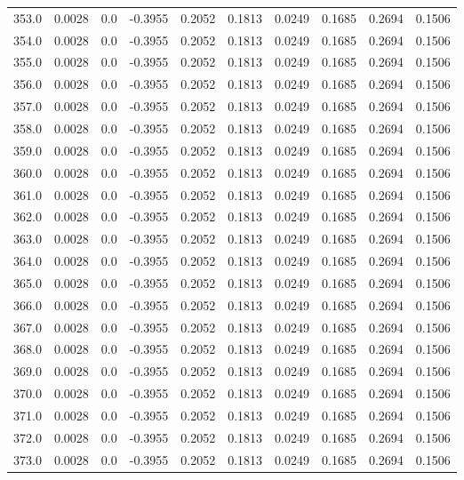 \begin{longtable}{lrrrrrrrrr}
353.0 & 0.0028 & 0.0 & -0.3955 & 0.2052 & 0.1813 & 0.0249 & 0.1685 & 0.2694 & 0.1506 \\
354.0 & 0.0028 & 0.0 & -0.3955 & 0.2052 & 0.1813 & 0.0249 & 0.1685 & 0.2694 & 0.1506 \\
355.0 & 0.0028 & 0.0 & -0.3955 & 0.2052 & 0.1813 & 0.0249 & 0.1685 & 0.2694 & 0.1506 \\
356.0 & 0.0028 & 0.0 & -0.3955 & 0.2052 & 0.1813 & 0.0249 & 0.1685 & 0.2694 & 0.1506 \\
357.0 & 0.0028 & 0.0 & -0.3955 & 0.2052 & 0.1813 & 0.0249 & 0.1685 & 0.2694 & 0.1506 \\
358.0 & 0.0028 & 0.0 & -0.3955 & 0.2052 & 0.1813 & 0.0249 & 0.1685 & 0.2694 & 0.1506 \\
359.0 & 0.0028 & 0.0 & -0.3955 & 0.2052 & 0.1813 & 0.0249 & 0.1685 & 0.2694 & 0.1506 \\
360.0 & 0.0028 & 0.0 & -0.3955 & 0.2052 & 0.1813 & 0.0249 & 0.1685 & 0.2694 & 0.1506 \\
361.0 & 0.0028 & 0.0 & -0.3955 & 0.2052 & 0.1813 & 0.0249 & 0.1685 & 0.2694 & 0.1506 \\
362.0 & 0.0028 & 0.0 & -0.3955 & 0.2052 & 0.1813 & 0.0249 & 0.1685 & 0.2694 & 0.1506 \\
363.0 & 0.0028 & 0.0 & -0.3955 & 0.2052 & 0.1813 & 0.0249 & 0.1685 & 0.2694 & 0.1506 \\
364.0 & 0.0028 & 0.0 & -0.3955 & 0.2052 & 0.1813 & 0.0249 & 0.1685 & 0.2694 & 0.1506 \\
365.0 & 0.0028 & 0.0 & -0.3955 & 0.2052 & 0.1813 & 0.0249 & 0.1685 & 0.2694 & 0.1506 \\
366.0 & 0.0028 & 0.0 & -0.3955 & 0.2052 & 0.1813 & 0.0249 & 0.1685 & 0.2694 & 0.1506 \\
367.0 & 0.0028 & 0.0 & -0.3955 & 0.2052 & 0.1813 & 0.0249 & 0.1685 & 0.2694 & 0.1506 \\
368.0 & 0.0028 & 0.0 & -0.3955 & 0.2052 & 0.1813 & 0.0249 & 0.1685 & 0.2694 & 0.1506 \\
369.0 & 0.0028 & 0.0 & -0.3955 & 0.2052 & 0.1813 & 0.0249 & 0.1685 & 0.2694 & 0.1506 \\
370.0 & 0.0028 & 0.0 & -0.3955 & 0.2052 & 0.1813 & 0.0249 & 0.1685 & 0.2694 & 0.1506 \\
371.0 & 0.0028 & 0.0 & -0.3955 & 0.2052 & 0.1813 & 0.0249 & 0.1685 & 0.2694 & 0.1506 \\
372.0 & 0.0028 & 0.0 & -0.3955 & 0.2052 & 0.1813 & 0.0249 & 0.1685 & 0.2694 & 0.1506 \\
373.0 & 0.0028 & 0.0 & -0.3955 & 0.2052 & 0.1813 & 0.0249 & 0.1685 & 0.2694 & 0.1506 \\

\end{longtable}
